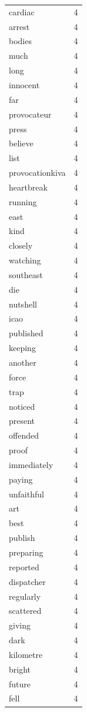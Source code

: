 \begin{tabular}{lr}
cardiac & 4 \\
arrest & 4 \\
bodies & 4 \\
much & 4 \\
long & 4 \\
innocent & 4 \\
far & 4 \\
provocateur & 4 \\
press & 4 \\
believe & 4 \\
list & 4 \\
provocationkiva & 4 \\
heartbreak & 4 \\
running & 4 \\
east & 4 \\
kind & 4 \\
closely & 4 \\
watching & 4 \\
southeast & 4 \\
die & 4 \\
nutshell & 4 \\
icao & 4 \\
published & 4 \\
keeping & 4 \\
another & 4 \\
force & 4 \\
trap & 4 \\
noticed & 4 \\
present & 4 \\
offended & 4 \\
proof & 4 \\
immediately & 4 \\
paying & 4 \\
unfaithful & 4 \\
art & 4 \\
best & 4 \\
publish & 4 \\
preparing & 4 \\
reported & 4 \\
dispatcher & 4 \\
regularly & 4 \\
scattered & 4 \\
giving & 4 \\
dark & 4 \\
kilometre & 4 \\
bright & 4 \\
future & 4 \\
fell & 4 \\

\end{tabular}
